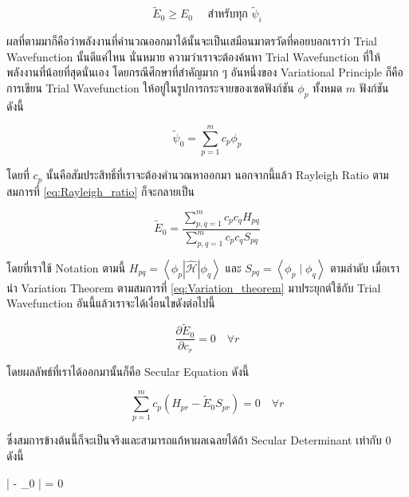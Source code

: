 \begin{equation}
    \label{eq:Variation_theorem}
    \tilde{E}_0 \geq E_0 \quad \text{ สำหรับทุก } \tilde{\psi}_i
\end{equation}

\noindent ผลที่ตามมาก็คือว่าพลังงานที่คำนวณออกมาได้นั้นจะเป็นเสมือนมาตรวัดที่คอยบอกเราว่า Trial Wavefunction นั้นดีแค่ไหน นั่นหมาย%
ความว่าเราจะต้องค้นหา Trial Wavefunction ที่ให้พลังงานที่น้อยที่สุดนั่นเอง โดยกรณีศึกษาที่สำคัญมาก ๆ อันหนึ่งของ Variational Principle
ก็คือการเขียน Trial Wavefunction ให้อยู่ในรูปการกระจายของเซตฟังก์ชัน $\phi_p$ ทั้งหมด $m$ ฟังก์ชัน ดังนี้

\begin{equation}
    \tilde{\psi}_0 = \sum_{p=1}^m c_p \phi_p
\end{equation}

\noindent โดยที่ $c_p$ นั้นคือสัมประสิทธิ์ที่เราจะต้องคำนวณหาออกมา นอกจากนี้แล้ว Rayleigh Ratio ตามสมการที่ \eqref{eq:Rayleigh_ratio}
ก็จะกลายเป็น

\begin{equation}
    \tilde{E}_0
    =
    \frac
    {
        \sum_{p, q=1}^m c_p c_q H_{p q}
    }
    {
        \sum_{p, q=1}^m c_p c_q S_{p q}
    }
\end{equation}

\noindent โดยที่เราใช้ Notation ตามนี้ $H_{p q}=\left\langle\phi_p|\hat{\mathscr{H}}| \phi_q\right\rangle$ และ
$S_{p q}=\left\langle\phi_p \mid \phi_q\right\rangle$ ตามลำดับ เมื่อเรานำ Variation Theorem ตามสมการที่
\eqref{eq:Variation_theorem} มาประยุกต์ใช้กับ Trial Wavefunction อันนี้แล้วเราจะได้เงื่อนไขดังต่อไปนี้

\begin{equation}
    \frac
    {
        \partial \tilde{E}_0
    }
    {
        \partial c_r
    }
    =
    0 \quad \forall r
\end{equation}

\noindent โดยผลลัพธ์ที่เราได้ออกมานั้นก็คือ Secular Equation ดังนี้

\begin{equation}
    \sum_{p=1}^{m} c_{p} \left( H_{pr} - \tilde{E}_{0} S_{pr} \right)
    =
    0 \quad \forall r
\end{equation}

\noindent ซึ่งสมการข้างต้นนี้ก็จะเป็นจริงและสามารถแก้หาผลเฉลยได้ถ้า Secular Determinant เท่ากับ 0 ดังนี้

\begin{tcolorbox}
    | - _{0} | = 0
\end{tcolorbox}

